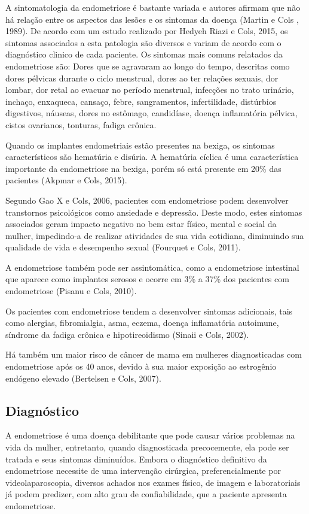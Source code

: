 \documentclass[12pt]{article} %
\begin{document}
A sintomatologia da endometriose é bastante variada e autores afirmam
que não há relação entre os aspectos das lesões e os sintomas da
doença (Martin e Cols , 1989).  De acordo com um estudo realizado por
Hedyeh Riazi e Cols, 2015, os sintomas associados a esta patologia são
diversos e variam de acordo com o diagnóstico clinico de cada
paciente. Os sintomas mais comuns relatados da endometriose são: Dores
que se agravaram ao longo do tempo, descritas como dores pélvicas
durante o ciclo menstrual, dores ao ter relações sexuais, dor lombar,
dor retal ao evacuar no período menstrual, infecções no trato
urinário, inchaço, enxaqueca, cansaço, febre, sangramentos,
infertilidade, distúrbios digestivos, náuseas, dores no estômago,
candidíase, doença inflamatória pélvica, cistos ovarianos, tonturas,
fadiga crônica.

Quando os implantes endometriais estão presentes na bexiga, os
sintomas característicos são hematúria e disúria. A hematúria cíclica
é uma característica importante da endometriose na bexiga, porém só
está presente em 20\% das pacientes (Akpınar e Cols, 2015).

Segundo Gao X e Cols, 2006, pacientes com endometriose podem
desenvolver transtornos psicológicos como ansiedade e depressão.
Deste modo, estes sintomas associados geram impacto negativo no bem
estar físico, mental e social da mulher, impedindo-a de realizar
atividades de sua vida cotidiana, diminuindo sua qualidade de vida e
desempenho sexual (Fourquet e Cols, 2011).

A endometriose também pode ser assintomática, como a endometriose
intestinal que aparece como implantes serosos e ocorre em 3\% a 37\% %
dos pacientes com endometriose (Pisanu e Cols, 2010).

Os pacientes com endometriose tendem a desenvolver sintomas
adicionais, tais como alergias, fibromialgia, asma, eczema, doença
inflamatória autoimune, síndrome da fadiga crônica e hipotireoidismo
(Sinaii e Cols, 2002).

Há também um maior risco de câncer de mama em mulheres diagnosticadas
com endometriose após os 40 anos, devido à sua maior exposição ao
estrogênio endógeno elevado (Bertelsen e Cols, 2007).

\subsection{Diagnóstico}

A endometriose é uma doença debilitante que pode causar vários
problemas na vida da mulher, entretanto, quando diagnosticada
precocemente, ela pode ser tratada e seus sintomas diminuídos.  Embora
o diagnóstico definitivo da endometriose necessite de uma intervenção
cirúrgica, preferencialmente por videolaparoscopia, diversos achados
nos exames físico, de imagem e laboratoriais já podem predizer, com
alto grau de confiabilidade, que a paciente apresenta endometriose.
\end{document}
